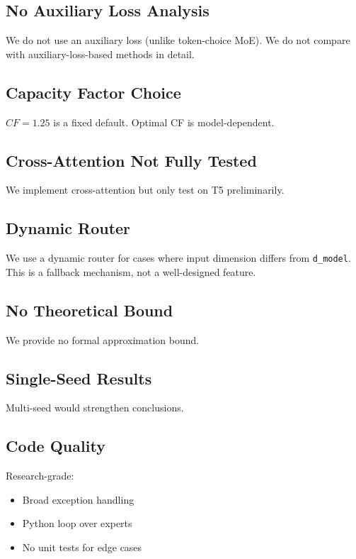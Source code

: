 \subsection{No Auxiliary Loss Analysis}

We do not use an auxiliary loss (unlike token-choice MoE). We do not 
compare with auxiliary-loss-based methods in detail.

\subsection{Capacity Factor Choice}

$CF = 1.25$ is a fixed default. Optimal CF is 
model-dependent.

\subsection{Cross-Attention Not Fully Tested}

We implement cross-attention but only test on T5 preliminarily.

\subsection{Dynamic Router}

We use a dynamic router for cases where input dimension differs from 
\texttt{d\_model}. This is a fallback mechanism, not a well-designed feature.

\subsection{No Theoretical Bound}

We provide no formal approximation bound.

\subsection{Single-Seed Results}

Multi-seed would strengthen conclusions.

\subsection{Code Quality}

Research-grade:
\begin{itemize}
\item Broad exception handling
\item Python loop over experts
\item No unit tests for edge cases

\end{itemize}
